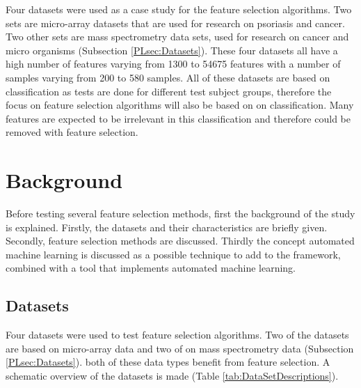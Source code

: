 \documentclass[10pt,a4paper]{report}
\begin{document}
	Four datasets were used as a case study for the feature selection algorithms. Two sets are micro-array datasets that are used for research on psoriasis\cite{nair2009genome, suarez2012expanding, bigler2013cross, yao2008type} and cancer\cite{wojnarski2010rsctc}. Two other sets are mass spectrometry data sets, used for research on cancer\cite{NIPS2004_2728} and micro organisms\cite{doi:10.1093/bioinformatics/btu022} (Subsection \ref{PLsec:Datasets}). These four datasets all have a high number of features varying from 1300 to 54675 features with a number of samples varying from 200 to 580 samples. All of these datasets are based on classification as tests are done for different test subject groups, therefore the focus on feature selection algorithms will also be based on on classification. Many features are expected to be irrelevant in this classification and therefore could be removed with feature selection.	
	
	\newpage
	\section{Background}
	\label{FSsec:Background}
	
	Before testing several feature selection methods, first the background of the study is explained. Firstly, the datasets and their characteristics are briefly given. Secondly, feature selection methods are discussed. Thirdly the concept automated machine learning is discussed as a possible technique to add to the framework, combined with a tool that implements automated machine learning.
	
	\subsection{Datasets}
	\label{FSsubsec:Datasets}
	
	Four datasets were used to test feature selection algorithms. Two of the datasets are based on micro-array data and two of on mass spectrometry data (Subsection \ref{PLsec:Datasets}). both of these data types benefit from feature selection. A schematic overview of the datasets is made (Table \ref{tab:DataSetDescriptions}).
	
\end{document}
